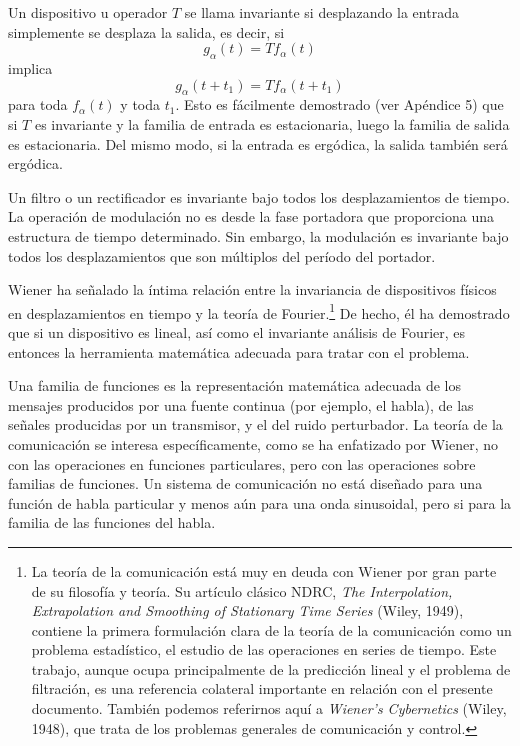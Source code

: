 Un dispositivo u operador $T$ se llama invariante si desplazando la
entrada simplemente se desplaza la salida, es decir, si
\begin{equation}
  g_{\alpha}(t) = Tf_{\alpha}(t)
\end{equation}
implica
\begin{equation}
  g_{\alpha}(t+t_1) = Tf_{\alpha}(t+t_1)
\end{equation}
para toda $f_{\alpha}(t)$ y toda $t_1$. Esto es f\'acilmente
demostrado (ver Ap\'endice 5) que si $T$ es invariante y la familia de
entrada es estacionaria, luego la familia de salida es
estacionaria. Del mismo modo, si la entrada es erg\'odica, la salida
tambi\'en ser\'a erg\'odica.

Un filtro o un rectificador es invariante bajo todos los
desplazamientos de tiempo. La operaci\'on de modulaci\'on no es desde
la fase portadora que proporciona una estructura de tiempo
determinado. Sin embargo, la modulaci\'on es invariante bajo todos los
desplazamientos que son m\'ultiplos del per\'iodo del portador.

Wiener ha se\~nalado la \'intima relaci\'on entre la invariancia de
dispositivos f\'isicos en desplazamientos en tiempo y la teor\'ia de
Fourier.\footnote[4]{La teor\'ia de la comunicaci\'on est\'a muy en
deuda con Wiener por gran parte de su filosof\'ia y teor\'ia. Su
art\'iculo cl\'asico NDRC, {\em The Interpolation, Extrapolation and
Smoothing of Stationary Time Series} (Wiley, 1949), contiene la
primera formulaci\'on clara de la teor\'ia de la comunicaci\'on como
un problema estad\'istico, el estudio de las operaciones en series de
tiempo. Este trabajo, aunque ocupa principalmente de la predicci\'on
lineal y el problema de filtraci\'on, es una referencia colateral
importante en relaci\'on con el presente documento. Tambi\'en podemos
referirnos aqu\'i a {\em Wiener's Cybernetics} (Wiley, 1948), que
trata de los problemas generales de comunicaci\'on y control.} De
hecho, \'el ha demostrado que si un dispositivo es lineal, as\'i como
el invariante an\'alisis de Fourier, es entonces la herramienta
matem\'atica adecuada para tratar con el problema.

Una familia de funciones es la representaci\'on matem\'atica adecuada
de los mensajes producidos por una fuente continua (por ejemplo, el
habla), de las se\~nales producidas por un transmisor, y el del ruido
perturbador. La teor\'ia de la comunicaci\'on se interesa
espec\'ificamente, como se ha enfatizado por Wiener, no con las
operaciones en funciones particulares, pero con las operaciones sobre
familias de funciones. Un sistema de comunicaci\'on no est\'a
dise\~nado para una funci\'on de habla particular y menos a\'un para
una onda sinusoidal, pero si para la familia de las funciones del
habla.

